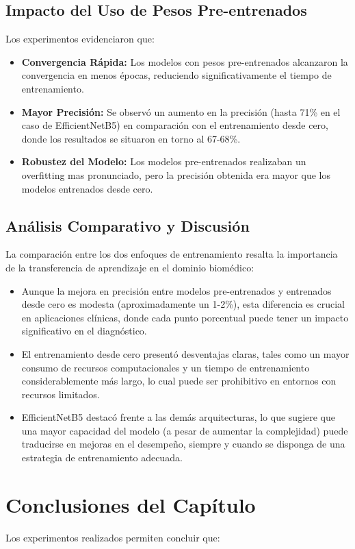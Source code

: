 \documentclass[11pt,spanish,listoffigures,listoftables]{tfgetsinf}
\begin{document}
\subsection{Impacto del Uso de Pesos Pre-entrenados}
Los experimentos evidenciaron que:
\begin{itemize}
    \item \textbf{Convergencia Rápida:} Los modelos con pesos pre-entrenados alcanzaron la convergencia en menos épocas, reduciendo significativamente el tiempo de entrenamiento.
    \item \textbf{Mayor Precisión:} Se observó un aumento en la precisión (hasta 71\% en el caso de EfficientNetB5) en comparación con el entrenamiento desde cero, donde los resultados se situaron en torno al 67-68\%.
    \item \textbf{Robustez del Modelo:} Los modelos pre-entrenados realizaban un overfitting mas pronunciado, pero la precisión obtenida era mayor que los modelos entrenados desde cero.
\end{itemize}

\subsection{Análisis Comparativo y Discusión}
La comparación entre los dos enfoques de entrenamiento resalta la importancia de la transferencia de aprendizaje en el dominio biomédico:
\begin{itemize}
    \item Aunque la mejora en precisión entre modelos pre-entrenados y entrenados desde cero es modesta (aproximadamente un 1-2\%), esta diferencia es crucial en aplicaciones clínicas, donde cada punto porcentual puede tener un impacto significativo en el diagnóstico.
    \item El entrenamiento desde cero presentó desventajas claras, tales como un mayor consumo de recursos computacionales y un tiempo de entrenamiento considerablemente más largo, lo cual puede ser prohibitivo en entornos con recursos limitados.
    \item EfficientNetB5 destacó frente a las demás arquitecturas, lo que sugiere que una mayor capacidad del modelo (a pesar de aumentar la complejidad) puede traducirse en mejoras en el desempeño, siempre y cuando se disponga de una estrategia de entrenamiento adecuada.
\end{itemize}

\section{Conclusiones del Capítulo}
Los experimentos realizados permiten concluir que:
\end{document}
